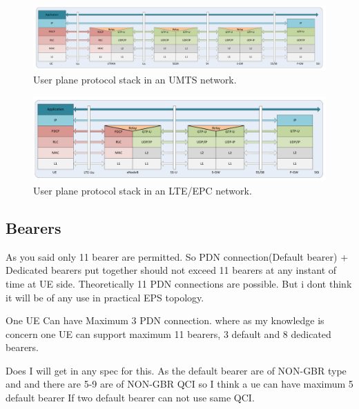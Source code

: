 \begin{figure}[htbp]
	\centering
	\includegraphics[width=1.2\textwidth]{images/3g-userplane.pdf}
	\caption{User plane protocol stack in an UMTS network.}
	\label{c4:fig:3gpp-umtsuserplane}
\end{figure}

\begin{figure}[htbp]
	\centering
	\includegraphics[width=1.2\textwidth]{images/LTE-userplane.pdf}
	\caption{User plane protocol stack in an LTE/EPC network.}
	\label{c4:fig:3gpp-lteuserplane}
\end{figure}



\subsection{Bearers}

As you said only 11 bearer are permitted.
So PDN connection(Default bearer) + Dedicated bearers put together should not exceed 11 bearers at any instant of time at UE side.
Theoretically 11 PDN connections are possible. But i dont think it will be of any use in practical EPS topology.

One UE Can have Maximum 3 PDN connection.
where as my knowledge is concern one UE can support maximum 11 bearers, 3 default and 8 dedicated bearers.

Does I will get in any spec for this. As the default bearer are of  NON-GBR type and and there are 5-9 are of NON-GBR QCI so I think a ue can have maximum 5 default bearer If two default bearer can not use same QCI.

